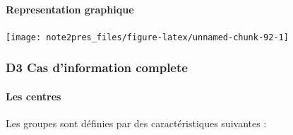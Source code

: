 \documentclass[11pt,]{article}
\let\oldparagraph\paragraph
\renewcommand{\paragraph}[1]{\oldparagraph{#1}\mbox{}}
\begin{document}
\hypertarget{representation-graphique}{%
\paragraph{Representation graphique}\label{representation-graphique}}

\begin{center}\texttt{[image: note2pres\_files/figure-latex/unnamed-chunk-92-1]} \end{center}

\hypertarget{d3-cas-dinformation-complete}{%
\subsubsection{D3 Cas d'information
complete}\label{d3-cas-dinformation-complete}}

\hypertarget{les-centres-1}{%
\paragraph{Les centres}\label{les-centres-1}}

Les groupes sont définies par des caractéristiques suivantes :

\FloatBarrier
\end{document}
